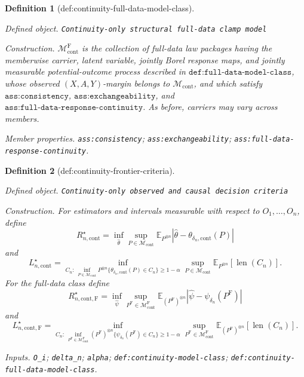 \documentclass{article}
\newtheorem{definition}{Definition}
\begin{document}
\begin{definition}[def:continuity-full-data-model-class]\label{def:continuity-full-data-model-class}
\par\smallskip\noindent\emph{Defined object.} \texttt{Continuity-\allowbreak{}only structural full-\allowbreak{}data clamp model}
\par\smallskip\noindent\emph{Construction.} \(\mathcal M_{\mathrm{cont}}^{\mathrm F}\) is the collection of full-data law packages having the memberwise carrier, latent variable, jointly Borel response maps, and jointly measurable potential-outcome process described in \(\texttt{def:full-data-model-class}\), whose observed \((X,A,Y)\)-margin belongs to \(\mathcal M_{\mathrm{cont}}\), and which satisfy \(\texttt{ass:consistency}\), \(\texttt{ass:exchangeability}\), and \(\texttt{ass:full-data-response-continuity}\).  As before, carriers may vary across members.
\par\smallskip\noindent\emph{Member properties.} \texttt{ass:\allowbreak{}consistency}; \texttt{ass:\allowbreak{}exchangeability}; \texttt{ass:\allowbreak{}full-\allowbreak{}data-\allowbreak{}response-\allowbreak{}continuity}.
\end{definition}

\begin{definition}[def:continuity-frontier-criteria]\label{def:continuity-frontier-criteria}
\par\smallskip\noindent\emph{Defined object.} \texttt{Continuity-\allowbreak{}only observed and causal decision criteria}
\par\smallskip\noindent\emph{Construction.} For estimators and intervals measurable with respect to \(O_1,\ldots,O_n\), define
\[
 R_{n,\mathrm{cont}}^\star
 =\inf_{\widehat\theta}\sup_{P\in\mathcal M_{\mathrm{cont}}}
 \mathbb E_{P^{\otimes n}}|\widehat\theta-\theta_{\delta_n,\mathrm{cont}}(P)|
\]
and
\[
 L_{n,\mathrm{cont}}^\star
 =\inf_{C_n:\,\inf_{P\in\mathcal M_{\mathrm{cont}}}P^{\otimes n}
 \{\theta_{\delta_n,\mathrm{cont}}(P)\in C_n\}\geq1-\alpha}
 \sup_{P\in\mathcal M_{\mathrm{cont}}}
 \mathbb E_{P^{\otimes n}}[\operatorname{len}(C_n)].
\]
For the full-data class define
\[
 R_{n,\mathrm{cont},\mathrm F}^\star
 =\inf_{\widehat\psi}\sup_{P^{\mathrm F}\in\mathcal M_{\mathrm{cont}}^{\mathrm F}}
 \mathbb E_{(P^{\mathrm F})^{\otimes n}}|\widehat\psi-\psi_{\delta_n}(P^{\mathrm F})|
\]
and
\[
 L_{n,\mathrm{cont},\mathrm F}^\star
 =\inf_{C_n:\,\inf_{P^{\mathrm F}\in\mathcal M_{\mathrm{cont}}^{\mathrm F}}
 (P^{\mathrm F})^{\otimes n}\{\psi_{\delta_n}(P^{\mathrm F})\in C_n\}\geq1-\alpha}
 \sup_{P^{\mathrm F}\in\mathcal M_{\mathrm{cont}}^{\mathrm F}}
 \mathbb E_{(P^{\mathrm F})^{\otimes n}}[\operatorname{len}(C_n)].
\]
\par\smallskip\noindent\emph{Inputs.} \texttt{O\_\allowbreak{}i}; \texttt{delta\_\allowbreak{}n}; \texttt{alpha}; \texttt{def:\allowbreak{}continuity-\allowbreak{}model-\allowbreak{}class}; \texttt{def:\allowbreak{}continuity-\allowbreak{}full-\allowbreak{}data-\allowbreak{}model-\allowbreak{}class}.
\end{definition}
\end{document}

